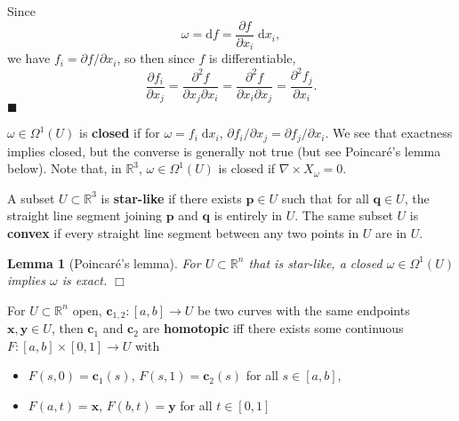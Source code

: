\documentclass[letter-paper]{tufte-book}
\newtheorem{lemma}[theorem]{\color{pastel-blue}Lemma}
\newenvironment{proof}[1][Proof]{\begin{trivlist}
\item[\hskip \labelsep {\bfseries #1}]}{\end{trivlist}}
\newcommand{\qed}{\hfill$\blacksquare$}
\newcommand{\qedwhite}{\hfill \ensuremath{\Box}}
\begin{document}
\begin{proof}
  Since
  \begin{equation*}
    \omega = \mathrm{d}f = \frac{\partial f}{\partial x_i}\; \mathrm{d}x_i,
  \end{equation*}
  we have $f_i = \partial f/ \partial x_i$, so then since $f$ is differentiable,
  \begin{equation*}
    \frac{\partial f_i}{\partial x_j} = \frac{\partial^2 f}{\partial x_j \partial x_i} = \frac{\partial^2 f}{\partial x_i \partial x_j} = \frac{\partial^2 f_j}{\partial x_i}.
  \end{equation*}
  \qed
\end{proof}

$\omega \in \Omega^1(U)$ is \textbf{closed} if for $\omega = f_i\; \mathrm{d}x_i$, $\partial f_i / \partial x_j = \partial f_j / \partial x_i$. We see that exactness implies closed, but the converse is generally not true (but see Poincar\'e's lemma below). Note that, in $\mathbb{R}^3$, $\omega \in \Omega^1(U)$ is closed if $\nabla \times X_\omega = 0$.

A subset $U\subset \mathbb{R}^3$ is \textbf{star-like} if there exists $\boldsymbol{p} \in  U$ such that for all $\boldsymbol{q} \in U$, the straight line segment joining $\boldsymbol{p}$ and $\boldsymbol{q}$ is entirely in $U$. The same subset $U$ is \textbf{convex} if every straight line segment between any two points in $U$ are in $U$.

\begin{lemma}[Poincar\'e's lemma]
  For $U \subset \mathbb{R}^n$ that is star-like, a closed $\omega \in \Omega^1(U) $ implies $\omega$ is exact. \qedwhite
\end{lemma}

For $U \subset \mathbb{R}^n$ open, $\boldsymbol{c}_{1,2} : [a, b] \to U$ be two curves with the same endpoints $\boldsymbol{x}, \boldsymbol{y} \in U$, then $\boldsymbol{c}_1$ and $\boldsymbol{c}_2$ are \textbf{homotopic} iff there exists some continuous $F: [a, b] \times [0, 1] \to U$ with
\begin{itemize}
  \item $F(s, 0) = \boldsymbol{c}_1(s)$, $F(s, 1) = \boldsymbol{c}_2(s)$ for all $s \in [a,b]$,
  \item $F(a, t) = \boldsymbol{x}$, $F(b,t) = \boldsymbol{y}$ for all $t \in [0, 1]$
\end{itemize}
\end{document}
